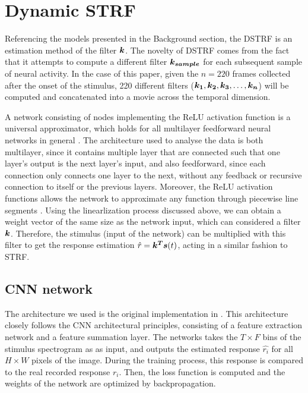 
\section{Dynamic STRF}
Referencing the models presented in the Background section, the DSTRF is an estimation method of the filter $\bm{k}$. The novelty of DSTRF comes from the fact that it attempts to compute a different filter $\bm{k_{sample}}$ for each subsequent sample of neural activity. In the case of this paper, given the $n = 220$ frames collected after the onset of the stimulus, 220 different filters ($\bm{k_1}, \bm{k_2}, \bm{k_3}, \dots, \bm{k_n}$) will be computed and concatenated into a movie across the temporal dimension. 

A network consisting of nodes implementing the ReLU activation function is a universal approximator, which holds for all multilayer feedforward neural networks in general \parencite{hornikMultilayerFeedforwardNetworks1989}. The architecture used to analyse the data is both multilayer, since it contains multiple layer that are connected such that one layer's output is the next layer's input, and also feedforward, since each connection only connects one layer to the next, without any feedback or recursive connection to itself or the previous layers. Moreover, the ReLU activation functions allows the network to approximate any function through piecewise line segments \parencite{keshishianEstimatingInterpretingNonlinear2020}. Using the linearlization process discussed above, we can obtain a weight vector of the same size as the network input, which can considered a filter $\bm{k}$. Therefore, the stimulus (input of the network) can be multiplied with this filter to get the response estimation $\hat{r} = \bm{k^T}\bm{s}(t)$, acting in a similar fashion to STRF.

\subsection{CNN network}
The architecture we used is the original implementation in \parencite{keshishianEstimatingInterpretingNonlinear2020}. This architecture closely follows the CNN architectural principles, consisting of a feature extraction network and a feature summation layer. The networks takes the $T \times F$ bins of the stimulus spectrogram as as input, and outputs the estimated response $\hat{r_i}$ for all $H \times W$ pixels of the image. During the training process, this response is compared to the real recorded response $r_i$. Then, the loss function is computed and the weights of the network are optimized by backpropagation.

